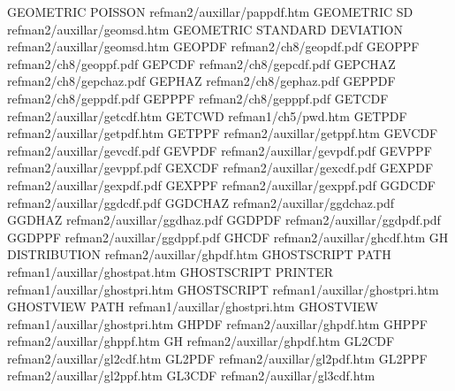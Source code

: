 GEOMETRIC POISSON                       refman2/auxillar/pappdf.htm
GEOMETRIC SD                            refman2/auxillar/geomsd.htm
GEOMETRIC STANDARD DEVIATION            refman2/auxillar/geomsd.htm
GEOPDF                                  refman2/ch8/geopdf.pdf
GEOPPF                                  refman2/ch8/geoppf.pdf
GEPCDF                                  refman2/ch8/gepcdf.pdf
GEPCHAZ                                 refman2/ch8/gepchaz.pdf
GEPHAZ                                  refman2/ch8/gephaz.pdf
GEPPDF                                  refman2/ch8/geppdf.pdf
GEPPPF                                  refman2/ch8/gepppf.pdf
GETCDF                                  refman2/auxillar/getcdf.htm
GETCWD                                  refman1/ch5/pwd.htm
GETPDF                                  refman2/auxillar/getpdf.htm
GETPPF                                  refman2/auxillar/getppf.htm
GEVCDF                                  refman2/auxillar/gevcdf.pdf
GEVPDF                                  refman2/auxillar/gevpdf.pdf
GEVPPF                                  refman2/auxillar/gevppf.pdf
GEXCDF                                  refman2/auxillar/gexcdf.pdf
GEXPDF                                  refman2/auxillar/gexpdf.pdf
GEXPPF                                  refman2/auxillar/gexppf.pdf
GGDCDF                                  refman2/auxillar/ggdcdf.pdf
GGDCHAZ                                 refman2/auxillar/ggdchaz.pdf
GGDHAZ                                  refman2/auxillar/ggdhaz.pdf
GGDPDF                                  refman2/auxillar/ggdpdf.pdf
GGDPPF                                  refman2/auxillar/ggdppf.pdf
GHCDF                                   refman2/auxillar/ghcdf.htm
GH DISTRIBUTION                         refman2/auxillar/ghpdf.htm
GHOSTSCRIPT PATH                        refman1/auxillar/ghostpat.htm
GHOSTSCRIPT PRINTER                     refman1/auxillar/ghostpri.htm
GHOSTSCRIPT                             refman1/auxillar/ghostpri.htm
GHOSTVIEW PATH                          refman1/auxillar/ghostpri.htm
GHOSTVIEW                               refman1/auxillar/ghostpri.htm
GHPDF                                   refman2/auxillar/ghpdf.htm
GHPPF                                   refman2/auxillar/ghppf.htm
GH                                      refman2/auxillar/ghpdf.htm
GL2CDF                                  refman2/auxillar/gl2cdf.htm
GL2PDF                                  refman2/auxillar/gl2pdf.htm
GL2PPF                                  refman2/auxillar/gl2ppf.htm
GL3CDF                                  refman2/auxillar/gl3cdf.htm
